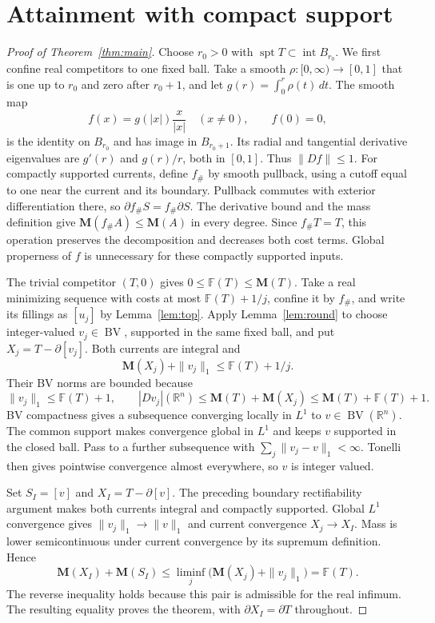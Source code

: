 \documentclass[11pt]{article}
\newcommand{\R}{\mathbb R}
\newcommand{\M}{\mathbf M}
\newcommand{\F}{\mathbb F}
\newcommand{\spt}{\operatorname{spt}}
\newcommand{\BV}{\operatorname{BV}}
\begin{document}
\section{Attainment with compact support}
\begin{proof}[Proof of Theorem~\ref{thm:main}]
Choose $r_0>0$ with $\spt T\subset\operatorname{int}B_{r_0}$.
We first confine real competitors to one fixed ball. Take a smooth
$\rho:[0,\infty)\to[0,1]$ that is one up to $r_0$ and zero after $r_0+1$,
and let $g(r)=\int_0^r\rho(t)\,dt$.
The smooth map
\[
f(x)=g(|x|)\frac{x}{|x|}\quad(x\ne0),\qquad f(0)=0,
\]
is the identity on $B_{r_0}$ and has image in $B_{r_0+1}$.
Its radial and tangential derivative eigenvalues are $g'(r)$ and $g(r)/r$,
both in $[0,1]$. Thus $\|Df\|\le1$.
For compactly supported currents, define $f_\#$ by smooth pullback, using a
cutoff equal to one near the current and its boundary. Pullback commutes
with exterior differentiation there, so $\partial f_\#S=f_\#\partial S$.
The derivative bound and the mass definition give $\M(f_\#A)\le\M(A)$ in
every degree. Since $f_\#T=T$, this operation preserves the decomposition
and decreases both cost terms. Global properness of $f$ is unnecessary for
these compactly supported inputs.

The trivial competitor $(T,0)$ gives $0\le\F(T)\le\M(T)$.
Take a real minimizing sequence with costs at most $\F(T)+1/j$, confine it
by $f_\#$, and write its fillings as $[u_j]$ by Lemma~\ref{lem:top}.
Apply Lemma~\ref{lem:round} to choose integer-valued $v_j\in\BV$, supported
in the same fixed ball, and put $X_j=T-\partial[v_j]$.
Both currents are integral and
\[
\M(X_j)+\|v_j\|_1\le\F(T)+1/j.
\]
Their BV norms are bounded because
\[
\|v_j\|_1\le\F(T)+1,\qquad
|Dv_j|(\R^n)\le\M(T)+\M(X_j)\le\M(T)+\F(T)+1.
\]
BV compactness gives a subsequence converging locally in $L^1$ to
$v\in\BV(\R^n)$. The common support makes convergence global in $L^1$
and keeps $v$ supported in the closed ball. Pass to a further subsequence
with $\sum_j\|v_j-v\|_1<\infty$. Tonelli then gives pointwise convergence
almost everywhere, so $v$ is integer valued.

Set $S_I=[v]$ and $X_I=T-\partial[v]$. The preceding boundary rectifiability
argument makes both currents integral and compactly supported. Global $L^1$
convergence gives $\|v_j\|_1\to\|v\|_1$ and current convergence
$X_j\to X_I$. Mass is lower semicontinuous under current convergence by its
supremum definition. Hence
\[
\M(X_I)+\M(S_I)
\le\liminf_j\bigl(\M(X_j)+\|v_j\|_1\bigr)=\F(T).
\]
The reverse inequality holds because this pair is admissible for the real
infimum. The resulting equality proves the theorem, with
$\partial X_I=\partial T$ throughout.
\end{proof}
\end{document}
